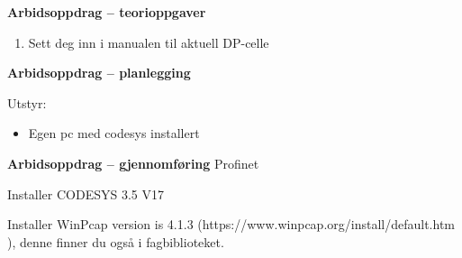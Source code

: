 \textbf{Arbidsoppdrag -- teorioppgaver}

\begin{enumerate}
	\item Sett deg inn i manualen til aktuell DP-celle
\end{enumerate}
\textbf{Arbidsoppdrag -- planlegging}

Utstyr:
\begin{itemize}[noitemsep]
	\item Egen pc med codesys installert 
\end{itemize}

\textbf{Arbidsoppdrag -- gjennomføring}
Profinet 

 

Installer CODESYS 3.5 V17 

Installer WinPcap version is 4.1.3  (https://www.winpcap.org/install/default.htm ), denne finner du også i fagbiblioteket. 


